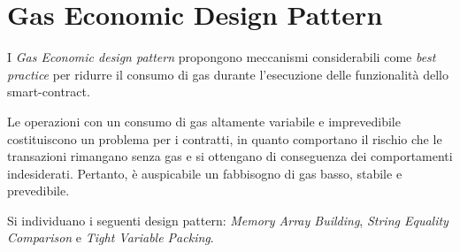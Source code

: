 {\section{Gas Economic Design Pattern}
	I \textit{Gas Economic design pattern} propongono meccanismi considerabili come \textit{best practice} per ridurre il consumo di gas durante l’esecuzione delle funzionalità dello smart-contract. \par
	Le operazioni con un consumo di gas altamente variabile e imprevedibile costituiscono un problema per i contratti, in quanto comportano il rischio che le transazioni rimangano senza gas e si ottengano di conseguenza dei comportamenti indesiderati. Pertanto, è auspicabile un fabbisogno di gas basso, stabile e prevedibile.\par
	Si individuano i seguenti design pattern: \textit{Memory Array Building}, \textit{String Equality Comparison} e \textit{Tight Variable Packing}.
	
}
